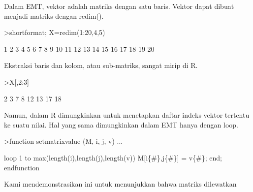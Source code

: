 \documentclass[a4paper,10pt]{article}
\begin{document}
\begin{eulernotebook}
\begin{eulercomment}
\begin{eulercomment}
\begin{eulercomment}
\begin{eulercomment}
\begin{eulercomment}
\begin{eulercomment}
\begin{eulercomment}
\begin{eulercomment}
\begin{eulercomment}
\begin{eulercomment}
\begin{eulercomment}
\begin{eulercomment}
\begin{eulercomment}
\begin{eulercomment}
\begin{eulercomment}
\begin{eulercomment}
\begin{eulercomment}
\begin{eulercomment}
\begin{eulercomment}
\begin{eulercomment}
\begin{eulercomment}
\begin{eulercomment}
\begin{eulercomment}
\begin{eulercomment}
\begin{eulercomment}
\begin{eulercomment}
\begin{eulercomment}
\begin{eulercomment}
\begin{eulercomment}
\begin{eulercomment}
\begin{eulercomment}
\begin{eulercomment}
\begin{eulercomment}
\begin{eulercomment}
\begin{eulercomment}
Dalam EMT, vektor adalah matriks dengan satu baris. Vektor dapat
dibuat menjadi matriks dengan redim().
\end{eulercomment}
\begin{eulerprompt}
>shortformat; X=redim(1:20,4,5)
\end{eulerprompt}
\begin{euleroutput}
          1         2         3         4         5 
          6         7         8         9        10 
         11        12        13        14        15 
         16        17        18        19        20 
\end{euleroutput}
\begin{eulercomment}
Ekstraksi baris dan kolom, atau sub-matriks, sangat mirip di R.
\end{eulercomment}
\begin{eulerprompt}
>X[,2:3]
\end{eulerprompt}
\begin{euleroutput}
          2         3 
          7         8 
         12        13 
         17        18 
\end{euleroutput}
\begin{eulercomment}
Namun, dalam R dimungkinkan untuk menetapkan daftar indeks vektor
tertentu ke suatu nilai. Hal yang sama dimungkinkan dalam EMT hanya
dengan loop.
\end{eulercomment}
\begin{eulerprompt}
>function setmatrixvalue (M, i, j, v) ...
\end{eulerprompt}
\begin{eulerudf}
  loop 1 to max(length(i),length(j),length(v))
     M[i\{#\},j\{#\}] = v\{#\};
  end;
  endfunction
\end{eulerudf}
\begin{eulercomment}
Kami mendemonstrasikan ini untuk menunjukkan bahwa matriks dilewatkan

\end{eulercomment}
\end{eulercomment}
\end{eulercomment}
\end{eulercomment}
\end{eulercomment}
\end{eulercomment}
\end{eulercomment}
\end{eulercomment}
\end{eulercomment}
\end{eulercomment}
\end{eulercomment}
\end{eulercomment}
\end{eulercomment}
\end{eulercomment}
\end{eulercomment}
\end{eulercomment}
\end{eulercomment}
\end{eulercomment}
\end{eulercomment}
\end{eulercomment}
\end{eulercomment}
\end{eulercomment}
\end{eulercomment}
\end{eulercomment}
\end{eulercomment}
\end{eulercomment}
\end{eulercomment}
\end{eulercomment}
\end{eulercomment}
\end{eulercomment}
\end{eulercomment}
\end{eulercomment}
\end{eulercomment}
\end{eulercomment}
\end{eulercomment}
\end{eulernotebook}
\end{document}
